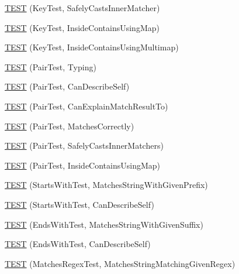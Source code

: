 \begin{DoxyCompactItemize}
\mbox{\hyperlink{namespacetesting_1_1gmock__matchers__test_a6b05d274d57a4aa120bb497c34ce3a68}{T\+E\+ST}} (Key\+Test, Safely\+Casts\+Inner\+Matcher)
\item 
\mbox{\hyperlink{namespacetesting_1_1gmock__matchers__test_af9f4e295413489a7e3acafc59584c3c4}{T\+E\+ST}} (Key\+Test, Inside\+Contains\+Using\+Map)
\item 
\mbox{\hyperlink{namespacetesting_1_1gmock__matchers__test_af90ca00690094484af6c34eadf4dd7c3}{T\+E\+ST}} (Key\+Test, Inside\+Contains\+Using\+Multimap)
\item 
\mbox{\hyperlink{namespacetesting_1_1gmock__matchers__test_a5689064ea3fe50424dd1ea036d107aa8}{T\+E\+ST}} (Pair\+Test, Typing)
\item 
\mbox{\hyperlink{namespacetesting_1_1gmock__matchers__test_a672ba279448f634fae495ed7dc9260bd}{T\+E\+ST}} (Pair\+Test, Can\+Describe\+Self)
\item 
\mbox{\hyperlink{namespacetesting_1_1gmock__matchers__test_a4ee8f3967e3658cd7bd340558922f131}{T\+E\+ST}} (Pair\+Test, Can\+Explain\+Match\+Result\+To)
\item 
\mbox{\hyperlink{namespacetesting_1_1gmock__matchers__test_acdb02e9ac603c91b35602751f6a81239}{T\+E\+ST}} (Pair\+Test, Matches\+Correctly)
\item 
\mbox{\hyperlink{namespacetesting_1_1gmock__matchers__test_ad2110445fe8f2f8ca947540f2a400228}{T\+E\+ST}} (Pair\+Test, Safely\+Casts\+Inner\+Matchers)
\item 
\mbox{\hyperlink{namespacetesting_1_1gmock__matchers__test_a9785412a9e786b1f81387204df577c73}{T\+E\+ST}} (Pair\+Test, Inside\+Contains\+Using\+Map)
\item 
\mbox{\hyperlink{namespacetesting_1_1gmock__matchers__test_ac8a66c592ff57cce28b6f1d5211fd370}{T\+E\+ST}} (Starts\+With\+Test, Matches\+String\+With\+Given\+Prefix)
\item 
\mbox{\hyperlink{namespacetesting_1_1gmock__matchers__test_a492143bbe0627c563c5d0c65bf3f4d5b}{T\+E\+ST}} (Starts\+With\+Test, Can\+Describe\+Self)
\item 
\mbox{\hyperlink{namespacetesting_1_1gmock__matchers__test_ac3d41540d2ae7956d33c9eae1be67d91}{T\+E\+ST}} (Ends\+With\+Test, Matches\+String\+With\+Given\+Suffix)
\item 
\mbox{\hyperlink{namespacetesting_1_1gmock__matchers__test_a80da065ed9f5fb87add88ae2bc14056d}{T\+E\+ST}} (Ends\+With\+Test, Can\+Describe\+Self)
\item 
\mbox{\hyperlink{namespacetesting_1_1gmock__matchers__test_a5983e981b59498c6427ddb183c414bb7}{T\+E\+ST}} (Matches\+Regex\+Test, Matches\+String\+Matching\+Given\+Regex)

\end{DoxyCompactItemize}
